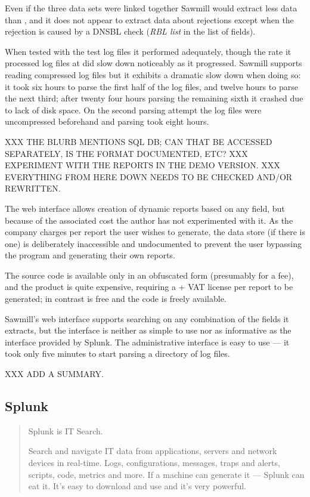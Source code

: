 Even if the three data sets were linked together Sawmill would extract less
data than \parsername{}, and it does not appear to extract data about
rejections except when the rejection is caused by a \gls{DNSBL} check
(\textit{RBL list\/} in the list of fields).

When tested with the \numberOFlogFILES{} test log files it performed
adequately, though the rate it processed log files at did slow down
noticeably as it progressed.  Sawmill supports reading compressed log files
but it exhibits a dramatic slow down when doing so: it took six hours to
parse the first half of the log files, and twelve hours to parse the next
third; after twenty four hours parsing the remaining sixth it crashed due
to lack of disk space.  On the second parsing attempt the log files were
uncompressed beforehand and parsing took eight hours.

XXX THE BLURB MENTIONS \gls{SQL} DB\@; CAN THAT BE ACCESSED SEPARATELY, IS
THE FORMAT DOCUMENTED, ETC\@?  XXX EXPERIMENT WITH THE REPORTS IN THE DEMO
VERSION\@.  XXX EVERYTHING FROM HERE DOWN NEEDS TO BE CHECKED AND/OR
REWRITTEN\@.

The web interface allows creation of dynamic reports based on any field,
but because of the associated cost the author has not experimented with it.
As the company charges per report the user wishes to generate, the data
store (if there is one) is deliberately inaccessible and undocumented to
prevent the user bypassing the program and generating their own reports.

The source code is available only in an obfuscated form (presumably for a
fee), and the product is quite expensive, requiring a  + VAT
license per report to be generated; in contrast \parsername{} is free and
the code is freely available.

Sawmill's web interface supports searching on any combination of the fields
it extracts, but the interface is neither as simple to use nor as
informative as the interface provided by Splunk.  The administrative
interface is easy to use --- it took only five minutes to start parsing a
directory of log files.

XXX ADD A SUMMARY\@.

\subsection{Splunk}

\begin{quotation}

    Splunk is IT Search.

    Search and navigate IT data from applications, servers and network
    devices in real-time. Logs, configurations, messages, traps and alerts,
    scripts, code, metrics and more. If a machine can generate it ---
    Splunk can eat it. It's easy to download and use and it's very
    powerful.

\end{quotation}

